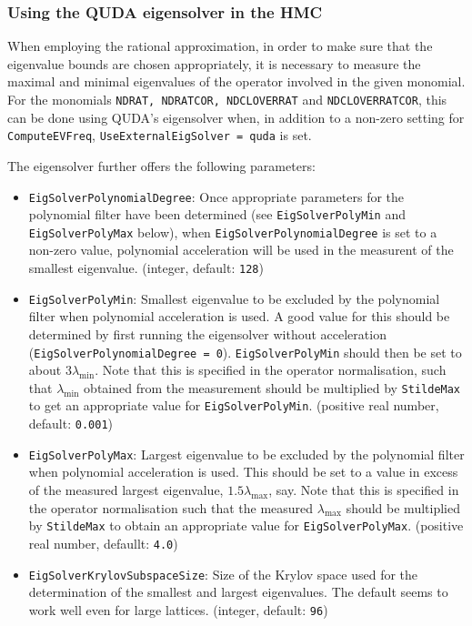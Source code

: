 \subsubsection{Using the QUDA eigensolver in the HMC}

When employing the rational approximation, in order to make sure that the eigenvalue bounds are chosen appropriately, it is necessary to measure the maximal and minimal eigenvalues of the operator involved in the given monomial.
For the monomials \texttt{NDRAT, NDRATCOR, NDCLOVERRAT} and \texttt{NDCLOVERRATCOR}, this can be done using QUDA's eigensolver when, in addition to a non-zero setting for \texttt{ComputeEVFreq}, \texttt{UseExternalEigSolver = quda} is set.

The eigensolver further offers the following parameters:
\begin{itemize}
  \item{ \texttt{EigSolverPolynomialDegree}: Once appropriate parameters for the polynomial filter have been determined (see \texttt{EigSolverPolyMin} and \texttt{EigSolverPolyMax} below), when \texttt{EigSolverPolynomialDegree} is set to a non-zero value, polynomial acceleration will be used in the measurent of the smallest eigenvalue. (integer, default: \texttt{128}) }
  \item{ \texttt{EigSolverPolyMin}: Smallest eigenvalue to be excluded by the polynomial filter when polynomial acceleration is used. A good value for this should be determined by first running the eigensolver without acceleration (\texttt{EigSolverPolynomialDegree = 0}). \texttt{EigSolverPolyMin} should then be set to about $3\lambda_\mathrm{min}$. Note that this is specified in the operator normalisation, such that $\lambda_\mathrm{min}$ obtained from the measurement should be multiplied by \texttt{StildeMax} to get an appropriate value for \texttt{EigSolverPolyMin}.  (positive real number, default: \texttt{0.001})}
  \item{ \texttt{EigSolverPolyMax}: Largest eigenvalue to be excluded by the polynomial filter when polynomial acceleration is used. This should be set to a value in excess of the measured largest eigenvalue, $1.5\lambda_\mathrm{max}$, say. Note that this is specified in the operator normalisation such that the measured $\lambda_\mathrm{max}$ should be multiplied by \texttt{StildeMax} to obtain an appropriate value for \texttt{EigSolverPolyMax}. (positive real number, defaullt: \texttt{4.0})}
  \item{ \texttt{EigSolverKrylovSubspaceSize}: Size of the Krylov space used for the determination of the smallest and largest eigenvalues. The default seems to work well even for large lattices. (integer, default: \texttt{96})}
\end{itemize}


